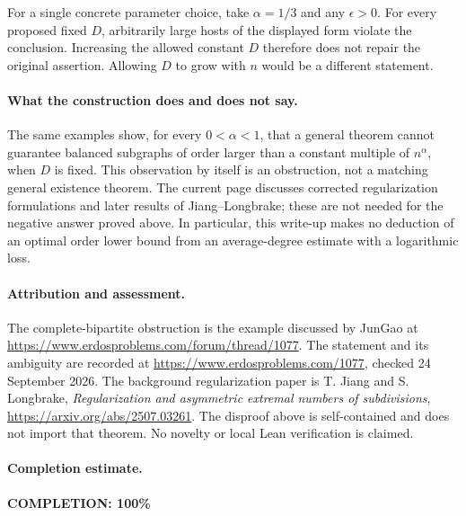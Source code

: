 For a single concrete parameter choice, take \(\alpha=1/3\) and any \(\epsilon>0\). For every proposed fixed \(D\), arbitrarily large hosts of the displayed form violate the conclusion. Increasing the allowed constant \(D\) therefore does not repair the original assertion. Allowing \(D\) to grow with \(n\) would be a different statement.

\paragraph{What the construction does and does not say.}
The same examples show, for every \(0<\alpha<1\), that a general theorem cannot guarantee balanced subgraphs of order larger than a constant multiple of \(n^\alpha\), when \(D\) is fixed. This observation by itself is an obstruction, not a matching general existence theorem.
The current page discusses corrected regularization formulations and later results of Jiang--Longbrake; these are not needed for the negative answer proved above. In particular, this write-up makes no deduction of an optimal order lower bound from an average-degree estimate with a logarithmic loss.

\paragraph{Attribution and assessment.}
The complete-bipartite obstruction is the example discussed by JunGao at \url{https://www.erdosproblems.com/forum/thread/1077}. The statement and its ambiguity are recorded at \url{https://www.erdosproblems.com/1077}, checked 24 September 2026. The background regularization paper is T. Jiang and S. Longbrake, \emph{Regularization and asymmetric extremal numbers of subdivisions}, \url{https://arxiv.org/abs/2507.03261}. The disproof above is self-contained and does not import that theorem. No novelty or local Lean verification is claimed.

\paragraph{Completion estimate.}
\textbf{COMPLETION: 100\%}
